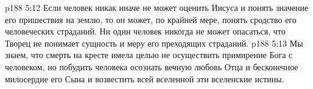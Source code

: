 \vs p188 5:12 \pc Если человек никак иначе не может оценить Иисуса и понять значение его пришествия на землю, то он может, по крайней мере, понять сродство его человеческих страданий. Ни один человек никогда не может опасаться, что Творец не понимает сущность и меру его преходящих страданий.
\vs p188 5:13 Мы знаем, что смерть на кресте имела целью не осуществить примирение Бога с человеком, но побудить человека осознать вечную любовь Отца и бесконечное милосердие его Сына и возвестить всей вселенной эти вселенские истины.
